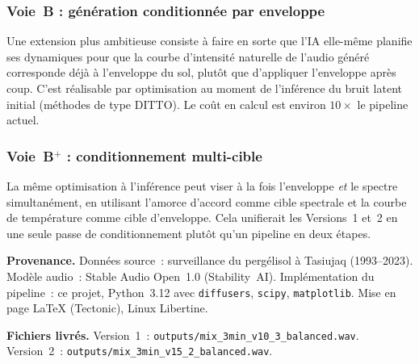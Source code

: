 \documentclass[11pt, a4paper]{article}
\begin{document}
\subsubsection{Voie~B : génération conditionnée par enveloppe}
Une extension plus ambitieuse consiste à faire en sorte que l'IA elle-même
planifie ses dynamiques pour que la courbe d'intensité naturelle de l'audio
généré corresponde déjà à l'enveloppe du sol, plutôt que d'appliquer
l'enveloppe après coup. C'est réalisable par optimisation au moment de
l'inférence du bruit latent initial (méthodes de type DITTO). Le coût en
calcul est environ $10\times$ le pipeline actuel.

\subsubsection{Voie~B$^{\!+}$ : conditionnement multi-cible}
La même optimisation à l'inférence peut viser à la fois l'enveloppe
\emph{et} le spectre simultanément, en utilisant l'amorce d'accord comme
cible spectrale et la courbe de température comme cible d'enveloppe. Cela
unifierait les Versions~1 et~2 en une seule passe de conditionnement
plutôt qu'un pipeline en deux étapes.

\vspace{2em}
\begin{flushleft}
{\sffamily\small\color{footergray}%
\textbf{Provenance.}\enspace%
Données source~: surveillance du pergélisol à Tasiujaq (1993--2023).
Modèle audio~: Stable Audio Open~1.0 (Stability~AI).
Implémentation du pipeline~: ce projet, Python~3.12 avec
\texttt{diffusers}, \texttt{scipy}, \texttt{matplotlib}.
Mise en page \LaTeX{} (Tectonic), Linux Libertine.\par
\medskip
\textbf{Fichiers livrés.}\enspace
Version~1~: \texttt{outputs/mix\_3min\_v10\_3\_balanced.wav}.\\
Version~2~: \texttt{outputs/mix\_3min\_v15\_2\_balanced.wav}.}
\end{flushleft}
\end{document}
